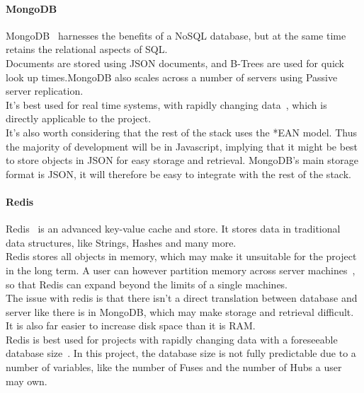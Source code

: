 \documentclass[draft,preprint,12pt,3p]{elsarticle}
\begin{document}
\paragraph{MongoDB}
MongoDB~\cite{mongodb} harnesses the benefits of a NoSQL database, but at the same time retains the relational aspects of SQL.\\
Documents are stored using JSON documents, and B-Trees are used for quick look up times.MongoDB also scales across a number of servers using Passive server replication.\\
It's best used for real time systems, with rapidly changing data~\cite{databasecomparison}, which is directly applicable to the project.\\
It's also worth considering that the rest of the stack uses the *EAN model. Thus the majority of development will be in Javascript, implying that it might be best to store objects in JSON for easy storage and retrieval. MongoDB's main storage format is JSON, it will therefore be easy to integrate with the rest of the stack. 

\paragraph{Redis}
Redis~\cite{redis} is an advanced key-value cache and store. It stores data in traditional data structures, like Strings, Hashes and many more.\\
Redis stores all objects in memory, which may make it unsuitable for the project in the long term. A user can however partition memory across server machines~\cite{redisfaq}, so that Redis can expand beyond the limits of a single machines.\\
The issue with redis is that there isn't a direct translation between database and server like there is in MongoDB, which may make storage and retrieval difficult. It is also far easier to increase disk space than it is RAM.\\
Redis is best used for projects with rapidly changing data with a foreseeable database size~\cite{databasecomparison}. In this project, the database size is not fully predictable due to a number of variables, like the number of Fuses and the number of Hubs a user may own.
\end{document}
